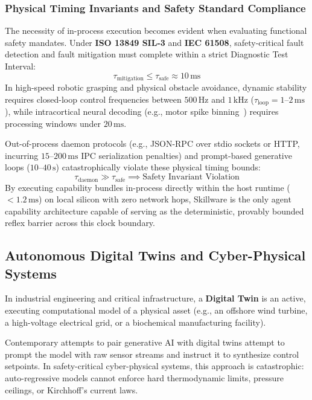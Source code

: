 \subsubsection{Physical Timing Invariants and Safety Standard Compliance}
The necessity of in-process execution becomes evident when evaluating functional safety mandates. Under \textbf{ISO 13849 SIL-3} and \textbf{IEC 61508}, safety-critical fault detection and fault mitigation must complete within a strict Diagnostic Test Interval:
\begin{equation}
\label{eq:safety_envelope}
\tau_{\text{mitigation}} \le \tau_{\text{safe}} \approx 10\,\text{ms}
\end{equation}
In high-speed robotic grasping and physical obstacle avoidance, dynamic stability requires closed-loop control frequencies between $500\,\text{Hz}$ and $1\,\text{kHz}$ ($\tau_{\text{loop}} = 1\text{--}2\,\text{ms}$), while intracortical neural decoding (e.g., motor spike binning~\cite{hochberg2006neuronal, willett2023speech}) requires processing windows under $20\,\text{ms}$.

Out-of-process daemon protocols (e.g., JSON-RPC over stdio sockets or HTTP, incurring $15\text{--}200\,\text{ms}$ IPC serialization penalties) and prompt-based generative loops ($10\text{--}40\,\text{s}$) catastrophically violate these physical timing bounds:
\begin{equation}
\label{eq:timing_violation}
\tau_{\text{daemon}} \gg \tau_{\text{safe}} \implies \text{Safety Invariant Violation}
\end{equation}
By executing capability bundles in-process directly within the host runtime ($<1.2\,\text{ms}$) on local silicon with zero network hops, Skillware is the only agent capability architecture capable of serving as the deterministic, provably bounded reflex barrier across this clock boundary.

\subsection{Autonomous Digital Twins and Cyber-Physical Systems}
\label{subsec:digital_twins}

In industrial engineering and critical infrastructure, a \textbf{Digital Twin} is an active, executing computational model of a physical asset (e.g., an offshore wind turbine, a high-voltage electrical grid, or a biochemical manufacturing facility).

Contemporary attempts to pair generative AI with digital twins attempt to prompt the model with raw sensor streams and instruct it to synthesize control setpoints. In safety-critical cyber-physical systems, this approach is catastrophic: auto-regressive models cannot enforce hard thermodynamic limits, pressure ceilings, or Kirchhoff's current laws.

